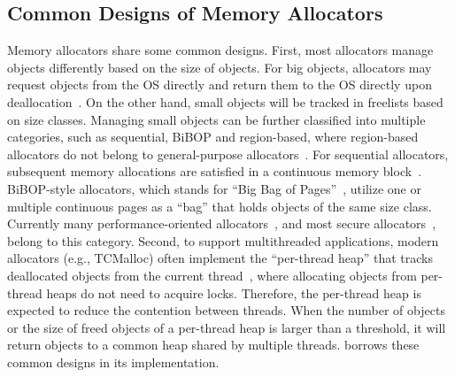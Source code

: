 \subsection{Common Designs of Memory Allocators}
\label{sec:commondesign}

Memory allocators share some common designs. First, most allocators manage objects differently based on the size of objects. For big objects, allocators may request objects from the OS directly and return them to the OS directly upon deallocation~\cite{Hoard}. On the other hand, small objects will be tracked in freelists based on size classes. Managing small objects can be further classified into multiple categories, such as sequential, BiBOP and region-based, where region-based allocators do not belong to general-purpose allocators~\cite{DieHarder, Gay:1998:MME:277650.277748}.
For sequential allocators, subsequent memory allocations are satisfied in a continuous memory block~\cite{Cling}. BiBOP-style allocators, which stands for ``Big Bag of Pages''~\cite{hanson1980portable}, utilize one or multiple continuous pages as a ``bag'' that holds objects of the same size class. 
Currently many performance-oriented allocators~\cite{tcmalloc, jemalloc, Scalloc}, and most secure allocators~\cite{openbsd, DieHarder, FreeGuard, Guarder}, belong to this category. Second, to support multithreaded applications, modern allocators (e.g., TCMalloc) often implement the ``per-thread heap'' that tracks deallocated objects from the current thread~\cite{tcmallocnuma}, where allocating objects from per-thread heaps do not need to acquire locks. Therefore, the per-thread heap is expected to reduce the contention between threads. When the number of objects or the size of freed objects of a per-thread heap is larger than a threshold, it will return objects to a common heap shared by multiple threads. \NM{} borrows these common designs in its implementation. 

 